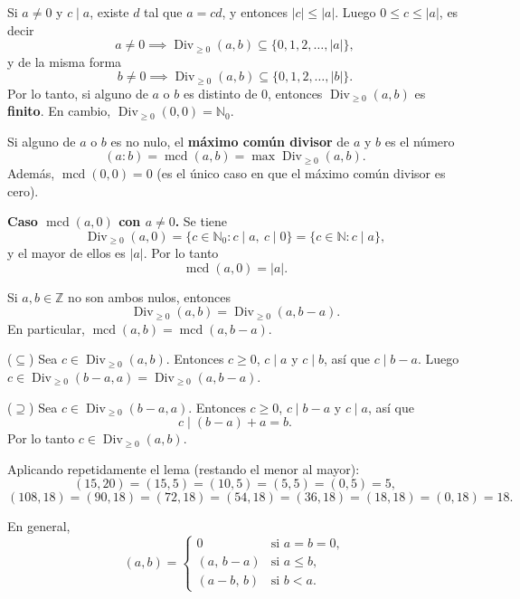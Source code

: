 \begin{nota}
Si $a\neq 0$ y $c\mid a$, existe $d$ tal que $a=cd$, y entonces
$|c|\le|a|$. Luego $0\le c\le|a|$, es decir
\[
a\neq 0 \implies \operatorname{Div}_{\ge 0}(a,b)\subseteq\{0,1,2,\dots,|a|\},
\]
y de la misma forma
\[
b\neq 0 \implies \operatorname{Div}_{\ge 0}(a,b)\subseteq\{0,1,2,\dots,|b|\}.
\]
Por lo tanto, si alguno de $a$ o $b$ es distinto de $0$, entonces
$\operatorname{Div}_{\ge 0}(a,b)$ es \textbf{finito}. En cambio,
$\operatorname{Div}_{\ge 0}(0,0)=\mathbb{N}_0$.
\end{nota}

\begin{definicion}[{title={Máximo común divisor}}]
Si alguno de $a$ o $b$ es no nulo, el \textbf{máximo común divisor} de
$a$ y $b$ es el número
\[
(a:b) = \operatorname{mcd}(a,b) = \max \operatorname{Div}_{\ge 0}(a,b).
\]
Además, $\operatorname{mcd}(0,0)=0$ (es el único caso en que el
máximo común divisor es cero).
\end{definicion}

\begin{teoria}
\textbf{Caso $\operatorname{mcd}(a,0)$ con $a\neq 0$.} Se tiene
\[
\operatorname{Div}_{\ge 0}(a,0) = \{ c\in\mathbb{N}_0 : c\mid a,\ c\mid 0\}
= \{ c\in\mathbb{N} : c\mid a\},
\]
y el mayor de ellos es $|a|$. Por lo tanto
\[
\operatorname{mcd}(a,0)=|a|.
\]
\end{teoria}

\begin{proposicion}[{title={Lema}}]
Si $a,b\in\mathbb{Z}$ no son ambos nulos, entonces
\[
\operatorname{Div}_{\ge 0}(a,b) = \operatorname{Div}_{\ge 0}(a,b-a).
\]
En particular, $\operatorname{mcd}(a,b)=\operatorname{mcd}(a,b-a)$.
\end{proposicion}

\begin{demostracion}
($\subseteq$) Sea $c\in\operatorname{Div}_{\ge 0}(a,b)$. Entonces
$c\ge 0$, $c\mid a$ y $c\mid b$, así que $c\mid b-a$. Luego
$c\in\operatorname{Div}_{\ge 0}(b-a,a)=\operatorname{Div}_{\ge 0}(a,b-a)$.

($\supseteq$) Sea $c\in\operatorname{Div}_{\ge 0}(b-a,a)$. Entonces
$c\ge 0$, $c\mid b-a$ y $c\mid a$, así que
\[
c \mid (b-a)+a = b.
\]
Por lo tanto $c\in\operatorname{Div}_{\ge 0}(a,b)$.
\end{demostracion}

\begin{ejemplo}
Aplicando repetidamente el lema (restando el menor al mayor):
\[
(15,20) = (15,5) = (10,5) = (5,5) = (0,5) = 5,
\]
\[
(108,18) = (90,18) = (72,18) = (54,18) = (36,18) = (18,18) = (0,18) = 18.
\]

En general,
\[
(a,b) =
\begin{cases}
0 & \text{si } a=b=0,\\
(a,\,b-a) & \text{si } a\le b,\\
(a-b,\,b) & \text{si } b<a.
\end{cases}
\]
\end{ejemplo}